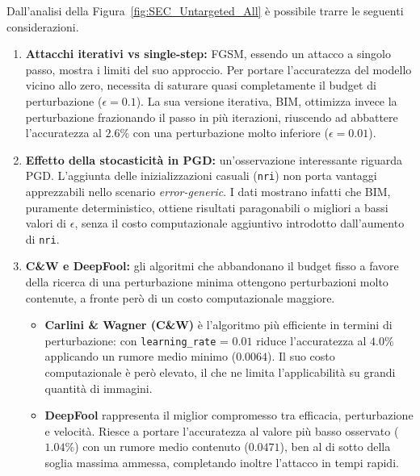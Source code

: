 \documentclass[a4paper, 12pt]{article}
\begin{document}
Dall'analisi della Figura~\ref{fig:SEC_Untargeted_All} è possibile trarre le 
seguenti considerazioni.
\begin{enumerate}
    \item \textbf{Attacchi iterativi vs single-step:} FGSM, essendo un attacco a 
    singolo passo, mostra i limiti del suo approccio. Per portare l'accuratezza 
    del modello vicino allo zero, necessita di saturare quasi completamente il 
    budget di perturbazione ($\epsilon = 0.1$). La sua versione iterativa, BIM, 
    ottimizza invece la perturbazione frazionando il passo in più iterazioni, 
    riuscendo ad abbattere l'accuratezza al $2.6\%$ con una perturbazione molto 
    inferiore ($\epsilon = 0.01$).

    \item \textbf{Effetto della stocasticità in PGD:} un'osservazione interessante 
    riguarda PGD. L'aggiunta delle inizializzazioni casuali (\texttt{nri}) non porta 
    vantaggi apprezzabili nello scenario \textit{error-generic}. I dati mostrano 
    infatti che BIM, puramente deterministico, ottiene risultati paragonabili o 
    migliori a bassi valori di $\epsilon$, senza il costo computazionale aggiuntivo 
    introdotto dall'aumento di \texttt{nri}.

    \item \textbf{C\&W e DeepFool:} gli 
    algoritmi che abbandonano il budget fisso a favore della ricerca di una 
    perturbazione minima ottengono perturbazioni molto contenute, a fronte però 
    di un costo computazionale maggiore.
    \begin{itemize}
        \item \textbf{Carlini \& Wagner (C\&W)} è l'algoritmo più efficiente in 
        termini di perturbazione: con \texttt{learning\_rate} = $0.01$ riduce 
        l'accuratezza al $4.0\%$ applicando un rumore medio minimo ($0.0064$). 
        Il suo costo computazionale è però elevato, il che ne limita 
        l'applicabilità su grandi quantità di immagini.
        \item \textbf{DeepFool} rappresenta il miglior compromesso tra efficacia, 
        perturbazione e velocità. Riesce a portare l'accuratezza al valore più 
        basso osservato ($1.04\%$) con un rumore medio contenuto ($0.0471$), 
        ben al di sotto della soglia massima ammessa, completando inoltre 
        l'attacco in tempi rapidi.
    \end{itemize}
\end{enumerate}


\vspace{15pt}
\end{document}
